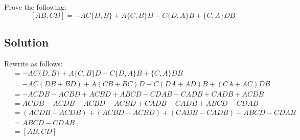 Prove the following:
\[ [AB, CD] = -AC\{D,B\} + A\{C,B\}D - C\{D, A\}B + \{C,A\}DB \]

\subsection*{Solution}
Rewrite as follows:
\begin{align*}
 [AB, CD] &= -AC\{D, B\} + A\{C, B\}D - C\{D, A\}B + \{C,A\}DB \\
 &= -AC(DB + BD) + A(CB + BC)D - C(DA + AD)B + (CA + AC)DB \\
 &= -ACDB - ACBD + ACBD + ABCD - CDAB - CADB + CADB + ACDB \\
 &= ACDB - ACDB + ACBD - ACBD + CADB - CADB + ABCD - CDAB  \\
 &= (ACDB - ACDB) + (ACBD - ACBD) + (CADB - CADB) + ABCD - CDAB \\
 &= ABCD - CDAB \\
 &= [AB, CD]
\end{align*}

